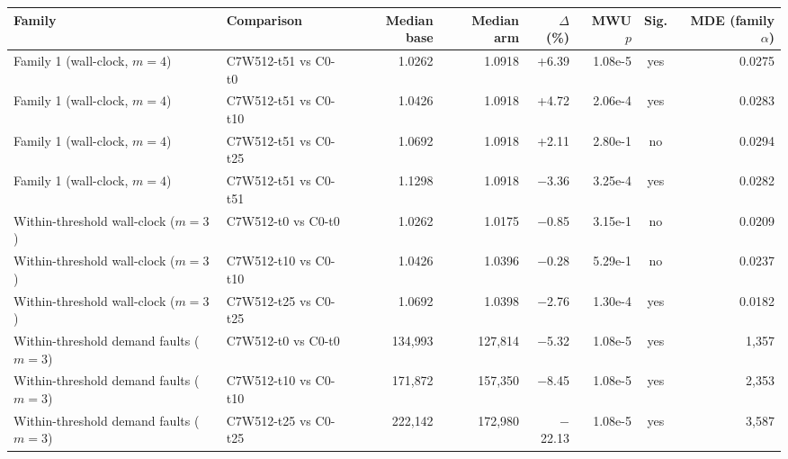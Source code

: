 \begin{tabular}{@{}llrrrrcr@{}}
\toprule
Family & Comparison & Median base & Median arm & $\Delta$ (\%) & MWU $p$ & Sig. & MDE (family $\alpha$) \\
\midrule
Family 1 (wall-clock, $m{=}4$) & C7W512-t51 vs C0-t0 & 1.0262 & 1.0918 & +6.39 & 1.08e-5 & yes & 0.0275 \\ %
Family 1 (wall-clock, $m{=}4$) & C7W512-t51 vs C0-t10 & 1.0426 & 1.0918 & +4.72 & 2.06e-4 & yes & 0.0283 \\ %
Family 1 (wall-clock, $m{=}4$) & C7W512-t51 vs C0-t25 & 1.0692 & 1.0918 & +2.11 & 2.80e-1 & no & 0.0294 \\ %
Family 1 (wall-clock, $m{=}4$) & C7W512-t51 vs C0-t51 & 1.1298 & 1.0918 & $-$3.36 & 3.25e-4 & yes & 0.0282 \\ %
\midrule
Within-threshold wall-clock ($m{=}3$) & C7W512-t0 vs C0-t0 & 1.0262 & 1.0175 & $-$0.85 & 3.15e-1 & no & 0.0209 \\ %
Within-threshold wall-clock ($m{=}3$) & C7W512-t10 vs C0-t10 & 1.0426 & 1.0396 & $-$0.28 & 5.29e-1 & no & 0.0237 \\ %
Within-threshold wall-clock ($m{=}3$) & C7W512-t25 vs C0-t25 & 1.0692 & 1.0398 & $-$2.76 & 1.30e-4 & yes & 0.0182 \\ %
\midrule
Within-threshold demand faults ($m{=}3$) & C7W512-t0 vs C0-t0 & 134{,}993 & 127{,}814 & $-$5.32 & 1.08e-5 & yes & 1{,}357 \\ %
Within-threshold demand faults ($m{=}3$) & C7W512-t10 vs C0-t10 & 171{,}872 & 157{,}350 & $-$8.45 & 1.08e-5 & yes & 2{,}353 \\ %
Within-threshold demand faults ($m{=}3$) & C7W512-t25 vs C0-t25 & 222{,}142 & 172{,}980 & $-$22.13 & 1.08e-5 & yes & 3{,}587 \\ %
\bottomrule
\end{tabular}
